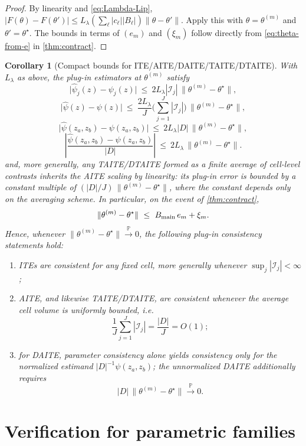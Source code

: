 \documentclass{statsoc}
\newtheorem{corollary}[corollary]{Corollary}
\newcommand{\1}{\mathbbm{1}}
\begin{document}
\begin{proof}
By linearity and \eqref{eq:Lambda-Lip},
$|F(\theta)-F(\theta')|\le L_\lambda(\sum_\ell |c_\ell||B_\ell|)\|\theta-\theta'\|$.
Apply this with $\theta=\theta^{(m)}$ and $\theta'=\theta^\star$.
The bounds in terms of $(e_m)$ and $(\xi_m)$ follow directly from \eqref{eq:theta-from-e} in \cref{thm:contract}.
\end{proof}

\begin{corollary}[Compact bounds for ITE/AITE/DAITE/TAITE/DTAITE]\label{cor:compact-estimands}
With $L_\lambda$ as above, the plug-in estimators at $\theta^{(m)}$ satisfy
\[
\big|\widehat\psi_j(z)-\psi_j(z)\big|\ \le\ 2L_\lambda |\mathcal I_j|\,\|\theta^{(m)}-\theta^\star\|,
\]
\[
\big|\widehat\psi(z)-\psi(z)\big|\ \le\ \frac{2L_\lambda}{J}\Big(\sum_{j=1}^J |\mathcal I_j|\Big)\,\|\theta^{(m)}-\theta^\star\|,
\]
\[
\big|\widehat\psi(z_a,z_b)-\psi(z_a,z_b)\big|\ \le\ 2L_\lambda |D|\,\|\theta^{(m)}-\theta^\star\|,
\]
\[
\left|\frac{\widehat\psi(z_a,z_b)-\psi(z_a,z_b)}{|D|}\right|
\ \le\ 2L_\lambda\,\|\theta^{(m)}-\theta^\star\|.
\]
and, more generally, any TAITE/DTAITE formed as a finite average of cell-level contrasts inherits the AITE scaling by linearity: its plug-in error is bounded by a constant multiple of \((|D|/J)\,\|\theta^{(m)}-\theta^\star\|\), where the constant depends only on the averaging scheme. In particular, on the event of \cref{thm:contract},
\[
\|\theta^{(m)}-\theta^\star\|\ \le\ B_{\rm main}\,e_m+\xi_m.
\]
Hence, whenever \(\|\theta^{(m)}-\theta^\star\|\xrightarrow{\mathbb P}0\), the following plug-in consistency statements hold:
\begin{enumerate}[nosep,label=(\alph*)]
\item ITEs are consistent for any fixed cell, more generally whenever \(\sup_j |\mathcal I_j|<\infty\);
\item AITE, and likewise TAITE/DTAITE, are consistent whenever the average cell volume is uniformly bounded, i.e.
\[
\frac{1}{J}\sum_{j=1}^J |\mathcal I_j|=\frac{|D|}{J}=O(1);
\]
\item for DAITE, parameter consistency alone yields consistency only for the normalized estimand \(|D|^{-1}\psi(z_a,z_b)\); the unnormalized DAITE additionally requires
\[
|D|\,\|\theta^{(m)}-\theta^\star\|\xrightarrow{\mathbb P}0.
\]
\end{enumerate}
\end{corollary}

\section{Verification for parametric families}
\end{document}
